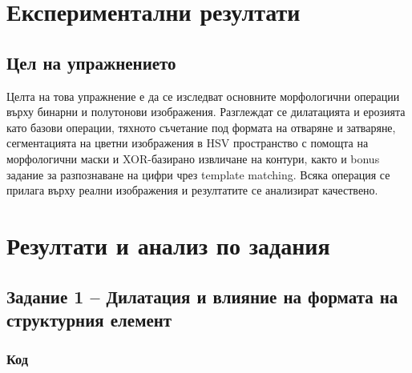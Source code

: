 
\section{Експериментални резултати}

\subsection{Цел на упражнението}

Целта на това упражнение е да се изследват основните морфологични операции върху бинарни и полутонови изображения. Разглеждат се дилатацията и ерозията като базови операции, тяхното съчетание под формата на отваряне и затваряне, сегментацията на цветни изображения в HSV пространство с помощта на морфологични маски и XOR-базирано извличане на контури, както и bonus задание за разпознаване на цифри чрез template matching. Всяка операция се прилага върху реални изображения и резултатите се анализират качествено.

\section{Резултати и анализ по задания}

\subsection{Задание 1 – Дилатация и влияние на формата на структурния елемент}

\subsubsection{Код}

